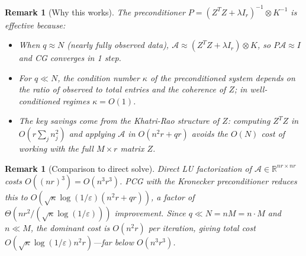 \documentclass[12pt]{article}
\newcommand{\bR}{\mathbb{R}}
\newtheorem{remark}[theorem]{Remark}
\newcommand{\bR}{\mathbb{R}}
\begin{document}
\begin{remark}[Why this works]
  The preconditioner $P = (Z^TZ+\lambda I_r)^{-1}\otimes K^{-1}$ is effective because:
  \begin{itemize}
    \item When $q \approx N$ (nearly fully observed data), $\mathcal{A} \approx (Z^TZ+\lambda I_r)\otimes K$, so $P\mathcal{A}\approx I$ and CG converges in 1 step.
    \item For $q \ll N$, the condition number $\kappa$ of the preconditioned system depends on the ratio of observed to total entries and the coherence of $Z$; in well-conditioned regimes $\kappa = O(1)$.
    \item The key savings come from the Khatri-Rao structure of $Z$: computing $Z^TZ$ in $O(r\sum_j n_j^2)$ and applying $\mathcal{A}$ in $O(n^2 r + qr)$ avoids the $O(N)$ cost of working with the full $M\times r$ matrix $Z$.
  \end{itemize}
\end{remark}

\begin{remark}[Comparison to direct solve]
  Direct LU factorization of $\mathcal{A}\in\bR^{nr\times nr}$ costs $O((nr)^3) = O(n^3 r^3)$.  PCG with the Kronecker preconditioner reduces this to $O(\sqrt\kappa\log(1/\varepsilon)(n^2r + qr))$, a factor of $\Theta(n r^2 / (\sqrt\kappa\log(1/\varepsilon)))$ improvement.  Since $q \ll N = n M = n\cdot M$ and $n\ll M$, the dominant cost is $O(n^2 r)$ per iteration, giving total cost $O(\sqrt\kappa\log(1/\varepsilon) n^2 r)$---far below $O(n^3 r^3)$.
\end{remark}
\end{document}
